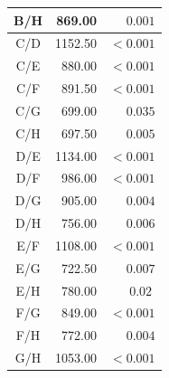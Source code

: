 \documentclass[12pt]{scrartcl}
\begin{document}
\begin{center}
\begin{longtable}{crc}
      B/H   &  869.00   & $\phantom{< }0.001$\sym{**\phantom{*}}   \\
      \midrule
      C/D   & 1152.50   & $< 0.001$\sym{***}                       \\*
      C/E   &  880.00   & $< 0.001$\sym{***}                       \\*
      C/F   &  891.50   & $< 0.001$\sym{***}                       \\*
      C/G   &  699.00   & $\phantom{< }0.035$\sym{*\phantom{**}}   \\*
      C/H   &  697.50   & $\phantom{< }0.005$\sym{**\phantom{*}}   \\
      \midrule
      D/E   & 1134.00   & $< 0.001$\sym{***}                       \\*
      D/F   &  986.00   & $< 0.001$\sym{***}                       \\*
      D/G   &  905.00   & $\phantom{< }0.004$\sym{**\phantom{*}}   \\*
      D/H   &  756.00   & $\phantom{< }0.006$\sym{**\phantom{*}}   \\
      \midrule
      E/F   & 1108.00   & $< 0.001$\sym{***}                       \\*
      E/G   &  722.50   & $\phantom{< }0.007$\sym{**\phantom{*}}   \\*
      E/H   &  780.00   & $\phantom{< }0.02$\sym{*\phantom{**}}    \\
      \midrule
      F/G   &  849.00   & $< 0.001$\sym{***}                       \\*
      F/H   &  772.00   & $\phantom{< }0.004$\sym{**\phantom{*}}   \\
      \midrule
      G/H   & 1053.00   & $< 0.001$\sym{***}                       \\
   \end{longtable}
\end{center}

\clearpage
\printbibliography
\end{document}
